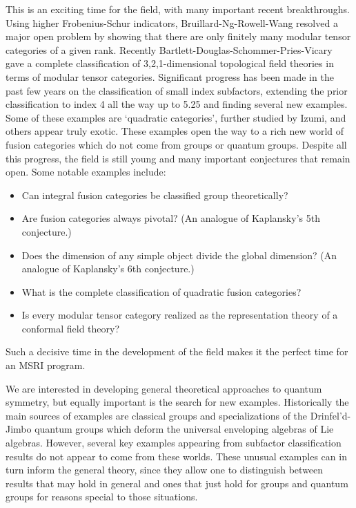 \documentclass[12pt]{article}
\begin{document}
This is an exciting time for the field, with many important recent breakthroughs. Using higher Frobenius-Schur indicators, Bruillard-Ng-Rowell-Wang resolved a major open problem by showing that there are only finitely many modular tensor categories of a given rank. Recently Bartlett-Douglas-Schommer-Pries-Vicary gave a complete classification of 3,2,1-dimensional topological field theories in terms of modular tensor categories. Significant progress has been made in the past few years on the classification of small index subfactors, extending the prior classification to index 4 all the way up to 5.25 and finding several new examples. Some of these examples are `quadratic categories', further studied by Izumi, and others appear truly exotic. These examples open the way to a rich new world of fusion categories which do not come from groups or quantum groups.  Despite all this progress, the field is still young and many important conjectures that remain open. Some notable examples include:
\begin{itemize}
  \setlength{\itemsep}{1pt}
  \setlength{\parskip}{0pt}
  \setlength{\parsep}{0pt}
\item Can integral fusion categories be classified group theoretically?
\item Are fusion categories always pivotal? (An analogue of Kaplansky's 5th conjecture.)
\item Does the dimension of any simple object divide the global dimension? (An analogue of Kaplansky's 6th conjecture.)
\item What is the complete classification of quadratic fusion categories?
\item Is every modular tensor category realized as the representation theory of a conformal field theory?
\end{itemize}
Such a decisive time in the development of the field makes it the perfect time for an MSRI program.

We are interested in developing general theoretical approaches to quantum symmetry, but equally important is the search for new examples. Historically the main sources of examples are classical groups and specializations of the Drinfel'd-Jimbo quantum groups which deform the universal enveloping algebras of Lie algebras. However, several key examples appearing from subfactor classification results do not appear to come from these worlds. These unusual examples can in turn inform the general theory, since they allow one to distinguish between results that may hold in general and ones that just hold for groups and quantum groups for reasons special to those situations.
\end{document}

